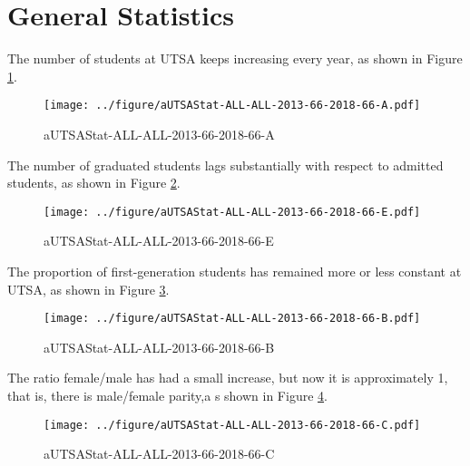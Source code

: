 \section{General Statistics}

\vspace{\fill}
The number of students at UTSA keeps increasing every year, as shown in Figure \ref{fig:../figure/aUTSAStat-ALL-ALL-2013-66-2018-66-A}. 
\begin{figure}[ht]
  \centering 
    \texttt{[image: ../figure/aUTSAStat-ALL-ALL-2013-66-2018-66-A.pdf]}
    \caption{aUTSAStat-ALL-ALL-2013-66-2018-66-A}
    \label{fig:../figure/aUTSAStat-ALL-ALL-2013-66-2018-66-A}
\end{figure}

\vspace{\fill}
The number of graduated students lags substantially with respect to admitted students, as shown in Figure \ref{fig:../figure/aUTSAStat-ALL-ALL-2013-66-2018-66-E}.
\begin{figure}[ht]
  \centering 
    \texttt{[image: ../figure/aUTSAStat-ALL-ALL-2013-66-2018-66-E.pdf]}
    \caption{aUTSAStat-ALL-ALL-2013-66-2018-66-E}
    \label{fig:../figure/aUTSAStat-ALL-ALL-2013-66-2018-66-E}
\end{figure}

\newpage
\vspace{\fill}
The proportion of first-generation students has remained more or less constant at UTSA, as shown in Figure \ref{fig:../figure/aUTSAStat-ALL-ALL-2013-66-2018-66-B}.
\begin{figure}[ht]
  \centering 
    \texttt{[image: ../figure/aUTSAStat-ALL-ALL-2013-66-2018-66-B.pdf]}
    \caption{aUTSAStat-ALL-ALL-2013-66-2018-66-B}
    \label{fig:../figure/aUTSAStat-ALL-ALL-2013-66-2018-66-B}
\end{figure}

\vspace{\fill}
The ratio female/male has had a small increase, but now it is approximately 1, that is, there is male/female parity,a s shown in Figure \ref{fig:../figure/aUTSAStat-ALL-ALL-2013-66-2018-66-C}.
\begin{figure}[ht]
  \centering 
    \texttt{[image: ../figure/aUTSAStat-ALL-ALL-2013-66-2018-66-C.pdf]}
    \caption{aUTSAStat-ALL-ALL-2013-66-2018-66-C}
    \label{fig:../figure/aUTSAStat-ALL-ALL-2013-66-2018-66-C}
\end{figure}

